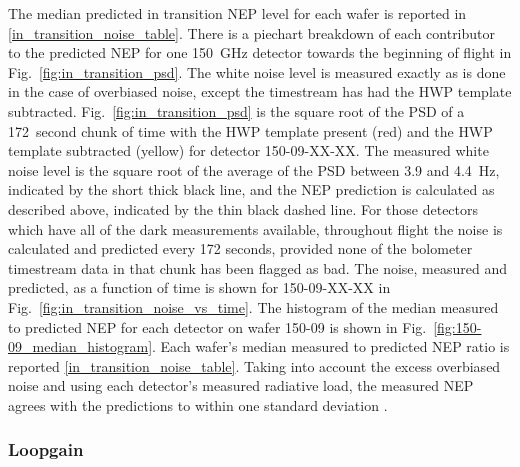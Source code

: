 The median predicted in transition \ac{NEP} level for each wafer is reported in \TAB\ref{in_transition_noise_table}. 
There is a piechart breakdown of each contributor to the predicted \ac{NEP} for one 150~GHz detector towards the beginning of flight in Fig.~\ref{fig:in_transition_psd}. 
The white noise level is measured exactly as is done in the case of overbiased noise, except the timestream has had the \ac{HWP} template subtracted. 
Fig.~\ref{fig:in_transition_psd} is the square root of the \ac{PSD} of a 172~second chunk of time with the \ac{HWP} template present (red) and the \ac{HWP} template subtracted (yellow) for detector 150-09-XX-XX. 
The measured white noise level is the square root of the average of the \ac{PSD} between 3.9 and 4.4~Hz, indicated by the short thick black line, and the \ac{NEP} prediction is calculated as described above, indicated by the thin black dashed line. 
For those detectors which have all of the dark measurements available, throughout flight the noise is calculated and predicted every 172 seconds, provided none of the bolometer timestream data in that chunk has been flagged as bad. 
The noise, measured and predicted, as a function of time is shown for 150-09-XX-XX in Fig.~\ref{fig:in_transition_noise_vs_time}. 
The histogram of the median measured to predicted \ac{NEP} for each detector on wafer 150-09 is shown in Fig.~\ref{fig:150-09_median_histogram}.
Each wafer's median measured to predicted \ac{NEP} ratio is reported \TAB\ref{in_transition_noise_table}. 
Taking into account the excess overbiased noise and using each detector's measured radiative load, the measured \ac{NEP} agrees with the predictions to within one standard deviation . 

\subsubsection{Loopgain}
\label{sec:loopgain}

